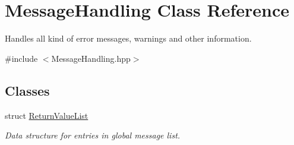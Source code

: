 \hypertarget{class_message_handling}{}\section{Message\+Handling Class Reference}
\label{class_message_handling}


Handles all kind of error messages, warnings and other information.  




{\ttfamily \#include $<$Message\+Handling.\+hpp$>$}

\subsection*{Classes}
\begin{DoxyCompactItemize}
\item 
struct \hyperlink{struct_message_handling_1_1_return_value_list}{Return\+Value\+List}
\begin{DoxyCompactList}\small\item\em Data structure for entries in global message list. \end{DoxyCompactList}\end{DoxyCompactItemize}
